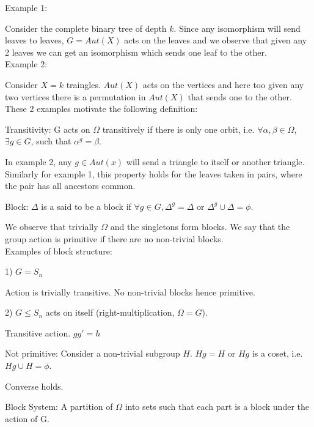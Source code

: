 Example 1:

Consider the complete binary tree of depth $k$. Since any isomorphism will send leaves to leaves, $G = Aut(X)$ acts on the leaves and we observe that given any 2 leaves we can get an isomorphism which sends one leaf to the other.\\

Example 2:

Consider $X = k$ traingles. $Aut(X)$ acts on the vertices and here too given any two vertices there is a permutation in $Aut(X)$ that sends one to the other. \\


These 2 examples motivate the following definition:

\begin{definition}{Transitivity:}
G acts on $\Omega$ transitively if there is only one orbit, i.e. $\forall \alpha,\beta \in \Omega$, $\exists g \in G$, such that $\alpha^g = \beta$.
\end{definition}


In example 2, any $g \in Aut(x)$ will send a triangle to itself or another triangle. Similarly for example 1, this property holds for the leaves taken in pairs, where the pair has all ancestors common.\\

\begin{definition}{Block:}
$\Delta$ is a said to be a block if $\forall g \in G, \Delta^g = \Delta$ or $\Delta^g \cup \Delta = \phi$.
\end{definition}


We observe that trivially $\Omega$ and the singletons form blocks. We say that the group action is primitive if there are no non-trivial blocks.\\


Examples of block structure:

1) $G = S_n$ 

Action is trivially transitive. No non-trivial blocks hence primitive.

2) $G \leq S_n$ acts on itself (right-multiplication, $\Omega = G$).

Transitive action. $g g' = h$

Not primitive: Consider a non-trivial subgroup $H$. $Hg = H$ or $Hg$ is a coset, i.e. $Hg \cup H = \phi$.

Converse holds.

\begin{definition}{Block System:}
A partition of $\Omega$ into sets such that each part is a block under the action of G.
\end{definition}

